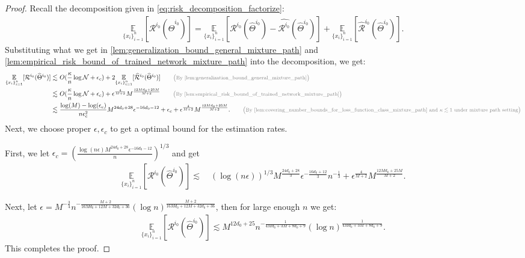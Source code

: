 \documentclass[12pt]{article}
\numberwithin{equation}{section}
\let\hat\widehat
\newcommand{\wh}{\widehat}
\renewcommand{\hat}{\wh}
\DeclareMathOperator*{\E}{{\mathbb{E}}}
\def\E{\mathbb{E}}
\theoremstyle{theoremstyle}
\numberwithin{equation}{section}
\numberwithin{theorem}{section}
\numberwithin{proposition}{section}
\numberwithin{definition}{section}
\numberwithin{lemma}{section}
\numberwithin{assumption}{section}
\numberwithin{remark}{section}
\newcommand*{\annot}[1]{\tag*{\footnotesize{\textcolor{black!50}{\big(#1\big)}}}}
\begin{document}
\begin{proof}
Recall the decomposition given in \eqref{eq:risk_decomposition_factorize}:
\begin{align*}
    \underset{\{x_i\}_{i=1}^n}{\E}[\mathcal{R}^{i_0}(\hat{\Theta}^{i_0})]=\underset{\{x_i\}_{i=1}^n}{\E}[\mathcal{R}^{i_0}(\hat{\Theta}^{i_0})-\hat{\mathcal{R}^{i_0}}(\hat{\Theta}^{i_0})]+\underset{\{x_i\}_{i=1}^n}{\E}[\hat{\mathcal{R}}^{i_0}(\hat{\Theta}^{i_0})].
\end{align*}
Substituting what we get in \cref{lem:generalization_bound_general_mixture_path} and \cref{lem:empirical_risk_bound_of_trained_network_mixture_path} into the decomposition, we get:
\begin{align*}
    \underset{\{x_i\}_{i=1}^n}{\E}[\mathcal{R}^{i_0}(\hat{\Theta}^{i_0})]\lesssim & ~
    O(\frac{\kappa}{n}\log\mathcal{N}+\epsilon_c)+2\underset{\{x_i\}_{i=1}^n}{\E}[\hat{\mathcal{R}}^{i_0}(\hat{\Theta}^{i_0})] \annot{By \cref{lem:generalization_bound_general_mixture_path}} \\
    \lesssim & ~
    O(\frac{\kappa}{n}\log\mathcal{N}+\epsilon_c)+\epsilon^\frac{4}{M+2}M^{\frac{12Md_0+25M}{M+2}} \annot{By \cref{lem:empirical_risk_bound_of_trained_network_mixture_path}}\\
    \lesssim & ~
    \frac{\log(M)-\log(\epsilon_c)}{n\epsilon_c^2}M^{24d_0+28}\epsilon^{-16d_0-12}+\epsilon_c+\epsilon^\frac{4}{M+2}M^{\frac{12Md_0+25M}{M+2}}. \annot{By \cref{lem:covering_number_bounds_for_loss_function_class_mixture_path} and $\kappa\lesssim 1$ under mixture path setting}
\end{align*}
Next, we choose proper $\epsilon,\epsilon_c$ to get a optimal bound for the estimation rates.

First, we let $\epsilon_c=(\frac{\log(n\epsilon)M^{24d_0+28}\epsilon^{-16d_0-12}}{n})^{1/3}$ and get
\begin{align*}
    \underset{\{x_i\}_{i=1}^n}{\E}[\mathcal{R}^{i_0}(\hat{\Theta}^{i_0})]\lesssim & ~
    (\log(n\epsilon))^{1/3}M^{\frac{24d_0+28}{3}}\epsilon^{-\frac{16d_0+12}{3}}n^{-\frac{1}{3}}+\epsilon^\frac{4}{M+2}M^{\frac{12Md_0+25M}{M+2}}.
\end{align*}

Next, let $\epsilon=M^{-\frac{3}{4}}n^{-\frac{M+2}{16Md_0+12M+32d_0+36}}(\log n)^{\frac{M+2}{16Md_0+12M+32d_0+36}}$, then for large enough $n$ we get:
\begin{align*}
    \underset{\{x_i\}_{i=1}^n}{\E}[\mathcal{R}^{i_0}(\hat{\Theta}^{i_0})] \lesssim M^{12d_0+25}n^{-\frac{ 1}{4Md_0+3M+8d_0+9}}(\log n)^{\frac{1}{4Md_0+3M+8d_0+9}}.
\end{align*}
This completes the proof.
\end{proof}
\end{document}
